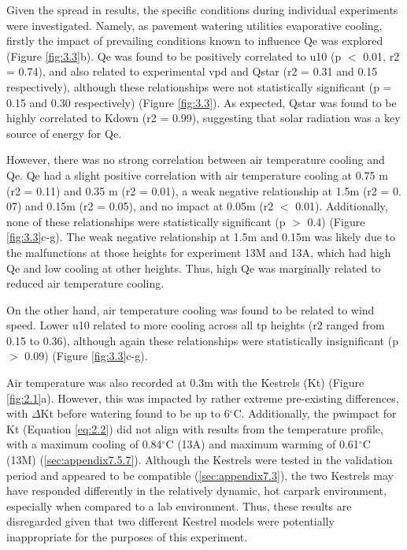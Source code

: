 \documentclass[final,3p,times,authoryear]{elsarticle}
\begin{document}
Given the spread in results, the specific conditions during individual experiments were
investigated. Namely, as pavement watering utilities evaporative cooling, firstly the
impact of prevailing conditions known to influence \gls{Qe} was explored (Figure \ref{fig:3.3}b). \gls{Qe} was found to be positively correlated to \gls{u10} (\gls{p} $<$ 0.01, \gls{r2} = 0.74), and also related to experimental \gls{vpd} and \gls{Qstar} (\gls{r2} = 0.31 and 0.15 respectively), although these relationships were not statistically significant (\gls{p} = 0.15 and 0.30 respectively) (Figure \ref{fig:3.3}). As expected, \gls{Qstar} was found to be highly correlated to \gls{Kdown} (\gls{r2} = 0.99), suggesting that solar radiation was a key source of energy for \gls{Qe}.

However, there was no strong correlation between air temperature cooling and \gls{Qe}. \gls{Qe} had a slight positive correlation with air temperature cooling at 0.75 m (\gls{r2} = 0.11) and 0.35 m (\gls{r2} = 0.01), a weak negative relationship at 1.5m (\gls{r2} = 0. 07) and 0.15m (\gls{r2} = 0.05), and no impact at 0.05m (\gls{r2} $<$ 0.01). Additionally, none of these relationships were statistically significant (\gls{p} $>$ 0.4) (Figure \ref{fig:3.3}c-g). The weak negative relationship at 1.5m and 0.15m was likely due to the malfunctions at those heights for experiment 13M and 13A, which had high \gls{Qe} and low cooling at other heights. Thus, high \gls{Qe} was marginally related to reduced air temperature cooling.

On the other hand, air temperature cooling was found to be related to wind speed.
Lower \gls{u10} related to more cooling across all \gls{tp} heights (\gls{r2} ranged from 0.15 to 0.36), although again these relationships were statistically insignificant (\gls{p} $>$ 0.09) (Figure \ref{fig:3.3}c-g).

Air temperature was also recorded at 0.3m with the Kestrels (\gls{Kt}) (Figure \ref{fig:2.1}a). However, this was impacted by rather extreme pre-existing differences, with $\Delta$\gls{Kt} before watering found to be up to 6$^{\circ}$C. Additionally, the \gls{pwimpact} for \gls{Kt} (Equation \ref{eq:2.2}) did not align with results from the temperature profile, with a maximum cooling of 0.84$^{\circ}$C (13A) and maximum warming of 0.61$^{\circ}$C (13M) (\ref{sec:appendix7.5.7}). Although the Kestrels were tested in the validation period and appeared to be compatible (\ref{sec:appendix7.3}), the two Kestrels may have responded differently in the relatively dynamic, hot carpark environment, especially when compared to a lab environment. Thus, these results are disregarded given that two different Kestrel models were potentially inappropriate for the purposes of this experiment.
\end{document}
